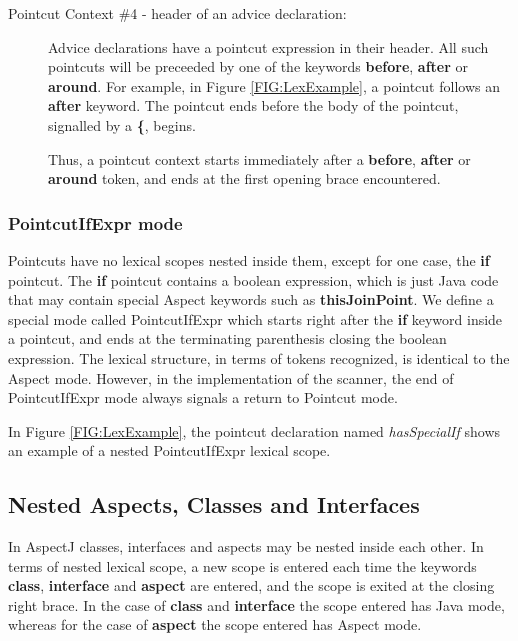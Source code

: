 \begin{description}
\item[Pointcut Context \#4 - header of an advice declaration:]

Advice declarations have a pointcut expression in their header.
All such pointcuts will be preceeded by one of the keywords
{\bf before}, {\bf after} or {\bf around}.    For example, in
Figure \ref{FIG:LexExample},  a pointcut follows an {\bf after} keyword.
The pointcut ends before the body of the pointcut, signalled by
a {\bf \{}, begins.

Thus, a pointcut context starts immediately after a {\bf before},
{\bf after} or {\bf around} token, and ends at the first opening
brace encountered.

\end{description}

\subsubsection{{\sc PointcutIfExpr} mode} 

Pointcuts have no lexical scopes nested inside them, 
except for one case, the
{\bf if} pointcut.   The {\bf if} pointcut contains a boolean
expression, which is just Java code that may contain special
Aspect keywords such as {\bf thisJoinPoint}.    We define a special
mode called {\sc PointcutIfExpr} which starts right after the
{\bf if} keyword inside a pointcut, and ends at the terminating
parenthesis closing the boolean expression.   The lexical structure,
in terms of tokens recognized, is identical to the {\sc Aspect} mode.    
However, in the implementation of the scanner, the end of 
{\sc PointcutIfExpr} mode always signals a return to 
{\sc Pointcut} mode.

In Figure \ref{FIG:LexExample}, the pointcut declaration named
{\em hasSpecialIf} shows an example of a nested {\sc PointcutIfExpr}
lexical scope.

\subsection{Nested Aspects, Classes and Interfaces}

In AspectJ classes, interfaces and aspects may be nested inside each 
other.   In terms of nested lexical scope,  a new scope is entered 
each time the keywords {\bf class}, {\bf interface} and {\bf aspect}
are entered,  and the scope is exited at the closing right brace.
In the case of {\bf class} and {\bf interface} the scope entered
has {\sc Java} mode,  whereas for the case of {\bf aspect} the scope
entered has {\sc Aspect} mode.

